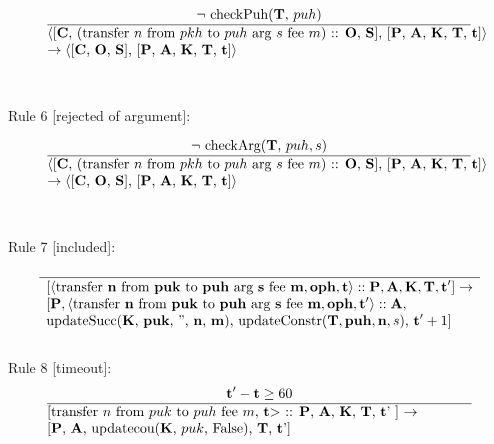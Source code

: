 \documentclass[a4paper]{llncs}
\begin{document}
\begin{equation}{}
\frac{\text{$\neg$ checkPuh(\CONTRACTORS, $puh$)}}{\parbox{4.2in}{\text{$\langle$[\ACCOUNTS, (transfer ${n}$ from ${pkh}$ to  ${puh}$ arg ${s}$ fee ${m}$) :: \OPERATIONS, \CONTRACTS], [\PENDING, \ACCEPTED, \MANAGERS, \CONTRACTORS, \TIME]$\rangle$ }\\
\text{$\rightarrow \langle$[\ACCOUNTS, \OPERATIONS, \CONTRACTS], [\PENDING, \ACCEPTED, \MANAGERS, \CONTRACTORS, \TIME]$\rangle$}}} 
\end{equation}
~\\
~\\
Rule 6 [rejected of argument]:

\begin{equation}{}
\frac{\text{$\neg$ checkArg(\CONTRACTORS, $puh, s$)}}{\parbox{4.2in}{\text{$\langle$[\ACCOUNTS, (transfer ${n}$ from ${pkh}$ to  ${puh}$ arg ${s}$ fee ${m}$) :: \OPERATIONS, \CONTRACTS], [\PENDING, \ACCEPTED, \MANAGERS, \CONTRACTORS, \TIME]$\rangle$}\\
\text{$\rightarrow \langle$[\ACCOUNTS, \OPERATIONS, \CONTRACTS], [\PENDING, \ACCEPTED, \MANAGERS, \CONTRACTORS, \TIME]$\rangle$}}} 
\end{equation}
~\\
~\\
Rule 7 [included]:

\begin{equation}
\frac{}{
  \begin{array}{l}
    {[\langle \TRANSFER[\STRING]\NTEZ\PUK\PUH\MTEZ, \OPH, \TIME
    \rangle :: \PENDING, \ACCEPTED, \MANAGERS, \CONTRACTORS, \TIME']}
    \rightarrow \\
    {}[\PENDING, \langle \TRANSFER[\STRING]\NTEZ\PUK\PUH\MTEZ, \OPH, \TIME' \rangle :: \ACCEPTED,  \\
    \text{updateSucc(\MANAGERS, \PUK, '', \NTEZ, \MTEZ), updateConstr$(\CONTRACTORS, \PUH, \NTEZ,
  s)$, $\TIME' + 1$]}
  \end{array}
}\label{eq:1}
\end{equation}
~\\
Rule 8 [timeout]:
\begin{equation}{}
\frac{\TIME' - \TIME \ge 60}{\parbox{4.2in}{\text{[transfer $n$ from $puk$ to  $puh$ fee $m$, \TIME $>$ :: \PENDING, \ACCEPTED, \MANAGERS, \CONTRACTORS, \TIME' ] $\rightarrow$} \\
\text{[\PENDING, \ACCEPTED, updatecou(\MANAGERS, $puk$, False), \CONTRACTORS, \TIME']}}} 
\end{equation}
\end{document}
